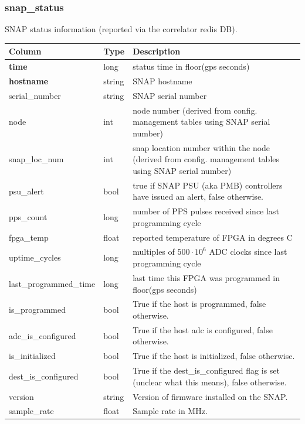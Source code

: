 \documentclass{article}
\begin{document}
{\subsubsection{snap\_status}
SNAP status information (reported via the correlator redis DB).
\begin{center}
 \begin{tabular}{| p{4cm} | p{2cm} | p{10cm} |}
\hline
 {\bf Column} & {\bf Type}  & {\bf Description} \\ [0.5ex]  \hline\hline
\textbf{time} & long & status time in floor(gps seconds)\\ \hline
\textbf{hostname} & string & SNAP hostname \\ \hline
serial\_number & string & SNAP serial number \\ \hline
node & int & node number (derived from config. management tables using SNAP serial number) \\ \hline
snap\_loc\_num & int & snap location number within the node (derived from config. management tables using SNAP serial number) \\ \hline
psu\_alert & bool & true if SNAP PSU (aka PMB) controllers have issued an alert, false otherwise. \\ \hline
pps\_count & long & number of PPS pulses received since last programming cycle \\\hline
fpga\_temp & float & reported temperature of FPGA  in degrees C \\\hline
uptime\_cycles & long & multiples of $500\cdot 10^6$ ADC clocks since last programming cycle \\\hline
last\_programmed\_time & long & last time this FPGA was programmed in floor(gps seconds)\\\hline
is\_programmed & bool & True if the host is programmed, false otherwise. \\ \hline
adc\_is\_configured & bool & True if the host adc is configured, false otherwise. \\ \hline
is\_initialized & bool & True if the host is initialized, false otherwise. \\ \hline
dest\_is\_configured & bool & True if the dest\_is\_configured flag is set (unclear what this means), false otherwise. \\ \hline
version & string & Version of firmware installed on the SNAP. \\ \hline
sample\_rate & float & Sample rate in MHz. \\\hline
\end{tabular}
\end{center}

}
\end{document}
